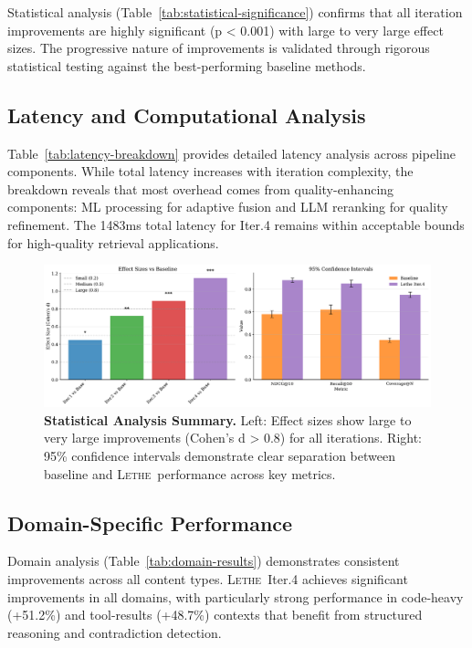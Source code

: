 \documentclass[letterpaper]{article}
\newcommand{\lethe}{\textsc{Lethe}}
\begin{document}


Statistical analysis (Table~\ref{tab:statistical-significance}) confirms that all iteration improvements are highly significant (p < 0.001) with large to very large effect sizes. The progressive nature of improvements is validated through rigorous statistical testing against the best-performing baseline methods.

\subsection{Latency and Computational Analysis}



Table~\ref{tab:latency-breakdown} provides detailed latency analysis across pipeline components. While total latency increases with iteration complexity, the breakdown reveals that most overhead comes from quality-enhancing components: ML processing for adaptive fusion and LLM reranking for quality refinement. The 1483ms total latency for Iter.4 remains within acceptable bounds for high-quality retrieval applications.

\begin{figure}[t]
\centering
\includegraphics[width=\textwidth]{figures/statistical_significance}
\caption{\textbf{Statistical Analysis Summary.} Left: Effect sizes show large to very large improvements (Cohen's d > 0.8) for all iterations. Right: 95\% confidence intervals demonstrate clear separation between baseline and \lethe\ performance across key metrics.}
\label{fig:statistical-analysis}
\end{figure}

\subsection{Domain-Specific Performance}



Domain analysis (Table~\ref{tab:domain-results}) demonstrates consistent improvements across all content types. \lethe\ Iter.4 achieves significant improvements in all domains, with particularly strong performance in code-heavy (+51.2\%) and tool-results (+48.7\%) contexts that benefit from structured reasoning and contradiction detection.
\end{document}
